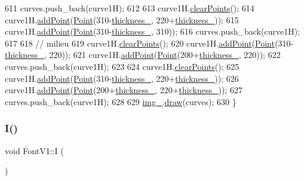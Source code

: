 \begin{DoxyCode}
611     curves.push\_back(curve1H);
612 
613     curve1H.\mbox{\hyperlink{class_bezier_curve_a0ba8ce66d5af5971ae6a1b506029728e}{clearPoints}}();
614     curve1H.\mbox{\hyperlink{class_bezier_curve_a38d16c18b36ae45619b05e26e226cf34}{addPoint}}(\mbox{\hyperlink{class_point}{Point}}(310-\mbox{\hyperlink{class_font_v1_aed8040e76be9a52833627b92f0fb4e5f}{thickness\_}}, 220+\mbox{\hyperlink{class_font_v1_aed8040e76be9a52833627b92f0fb4e5f}{thickness\_}}));
615     curve1H.\mbox{\hyperlink{class_bezier_curve_a38d16c18b36ae45619b05e26e226cf34}{addPoint}}(\mbox{\hyperlink{class_point}{Point}}(310-\mbox{\hyperlink{class_font_v1_aed8040e76be9a52833627b92f0fb4e5f}{thickness\_}}, 310));
616     curves.push\_back(curve1H);
617 
618     \textcolor{comment}{// milieu}
619     curve1H.\mbox{\hyperlink{class_bezier_curve_a0ba8ce66d5af5971ae6a1b506029728e}{clearPoints}}();
620     curve1H.\mbox{\hyperlink{class_bezier_curve_a38d16c18b36ae45619b05e26e226cf34}{addPoint}}(\mbox{\hyperlink{class_point}{Point}}(310-\mbox{\hyperlink{class_font_v1_aed8040e76be9a52833627b92f0fb4e5f}{thickness\_}}, 220));
621     curve1H.\mbox{\hyperlink{class_bezier_curve_a38d16c18b36ae45619b05e26e226cf34}{addPoint}}(\mbox{\hyperlink{class_point}{Point}}(200+\mbox{\hyperlink{class_font_v1_aed8040e76be9a52833627b92f0fb4e5f}{thickness\_}}, 220));
622     curves.push\_back(curve1H);
623 
624     curve1H.\mbox{\hyperlink{class_bezier_curve_a0ba8ce66d5af5971ae6a1b506029728e}{clearPoints}}();
625     curve1H.\mbox{\hyperlink{class_bezier_curve_a38d16c18b36ae45619b05e26e226cf34}{addPoint}}(\mbox{\hyperlink{class_point}{Point}}(310-\mbox{\hyperlink{class_font_v1_aed8040e76be9a52833627b92f0fb4e5f}{thickness\_}}, 220+\mbox{\hyperlink{class_font_v1_aed8040e76be9a52833627b92f0fb4e5f}{thickness\_}}));
626     curve1H.\mbox{\hyperlink{class_bezier_curve_a38d16c18b36ae45619b05e26e226cf34}{addPoint}}(\mbox{\hyperlink{class_point}{Point}}(200+\mbox{\hyperlink{class_font_v1_aed8040e76be9a52833627b92f0fb4e5f}{thickness\_}}, 220+\mbox{\hyperlink{class_font_v1_aed8040e76be9a52833627b92f0fb4e5f}{thickness\_}}));
627     curves.push\_back(curve1H);
628 
629     \mbox{\hyperlink{class_font_v1_a00569e3e3c4b70f437b63f396f735fb0}{img\_}}.\mbox{\hyperlink{class_image_a8d162f3cab956131d58708c09aa560b0}{draw}}(curves);
630 \}
\end{DoxyCode}
\mbox{\label{class_font_v1_aab86d5ae867a26e0384c919f82f0bcf1}} 
\subsubsection{\texorpdfstring{I()}{I()}}
{\footnotesize\ttfamily void Font\+V1\+::I (\begin{DoxyParamCaption}{ }\end{DoxyParamCaption})}



